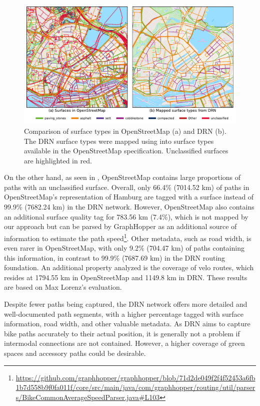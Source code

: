 \begin{figure}[t]
\centering
\includegraphics[width=\linewidth]{images/routing-drn-osm-map-surfaces.pdf} 
\caption{Comparison of surface types in OpenStreetMap (a) and DRN (b). The DRN surface types were mapped using  into surface types available in the OpenStreetMap specification. Unclassified surfaces are highlighted in red.}
\label{fig:routing-drn-osm-map-surfaces}
\end{figure}

On the other hand, as seen in , OpenStreetMap contains large proportions of paths with an unclassified surface. Overall, only 66.4\% (7014.52 km) of paths in OpenStreetMap's representation of Hamburg are tagged with a surface instead of 99.9\% (7682.24 km) in the DRN network. However, OpenStreetMap also contains an additional surface quality tag for 783.56 km (7.4\%), which is not mapped by our approach but can be parsed by GraphHopper as an additional source of information to estimate the path speed\footnote{\url{https://github.com/graphhopper/graphhopper/blob/71d2de049f2f4f52453a6fb1b7d558b9f0fa011f/core/src/main/java/com/graphhopper/routing/util/parsers/BikeCommonAverageSpeedParser.java\#L103}}. Other metadata, such as road width, is even rarer in OpenStreetMap, with only 9.2\% (704.47 km) of paths containing this information, in contrast to 99.9\% (7687.69 km) in the DRN routing foundation. An additional property analyzed is the coverage of velo routes, which resides at 1794.55 km in OpenStreetMap and 1149.8 km in DRN. These results are based on Max Lorenz's \cite{lorenz_2022} evaluation.

Despite fewer paths being captured, the DRN network offers more detailed and well-documented path segments, with a higher percentage tagged with surface information, road width, and other valuable metadata. As DRN aims to capture bike paths accurately to their actual position, it is generally not a problem if intermodal connections are not contained. However, a higher coverage of green spaces and accessory paths could be desirable. 

